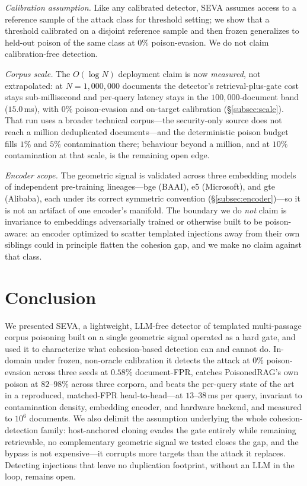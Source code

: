 \documentclass[conference]{IEEEtran}
\begin{document}
\emph{Calibration assumption.} Like any calibrated detector, SEVA assumes access
to a reference sample of the attack class for threshold setting; we show that a
threshold calibrated on a disjoint reference sample and then frozen generalizes to
held-out poison of the same class at $0\%$ poison-evasion.
We do not claim calibration-free detection.

\emph{Corpus scale.} The $O(\log N)$ deployment claim is now \emph{measured}, not
extrapolated: at $N=1{,}000{,}000$ documents the detector's retrieval-plus-gate cost
stays sub-millisecond and per-query latency stays in the $100{,}000$-document band
($15.0$\,ms), with $0\%$ poison-evasion and on-target calibration
(\S\ref{subsec:scale}). That run uses a broader technical corpus---the security-only
source does not reach a million deduplicated documents---and the deterministic poison
budget fills $1\%$ and $5\%$ contamination there; behaviour beyond a million, and at
$10\%$ contamination at that scale, is the remaining open edge.

\emph{Encoder scope.} The geometric signal is validated across three embedding models
of independent pre-training lineages---bge (BAAI), e5 (Microsoft), and gte (Alibaba),
each under its correct symmetric convention (\S\ref{subsec:encoder})---so it is not an
artifact of one encoder's manifold. The boundary we do \emph{not} claim is invariance
to embeddings adversarially trained or otherwise built to be poison-aware: an encoder
optimized to scatter templated injections away from their own siblings could in
principle flatten the cohesion gap, and we make no claim against that class.

\section{Conclusion}
We presented SEVA, a lightweight, LLM-free detector of templated multi-passage corpus
poisoning built on a single geometric signal operated as a hard gate, and used it to
characterize what cohesion-based detection can and cannot do. In-domain under frozen,
non-oracle calibration it detects the attack at $0\%$ poison-evasion across three seeds at
$0.58\%$ document-FPR, catches PoisonedRAG's own poison at $82$--$98\%$ across three corpora,
and beats the per-query state of the art in a reproduced, matched-FPR head-to-head---at
$13$--$38$\,ms per query, invariant to contamination density, embedding encoder, and hardware
backend, and measured to $10^6$ documents. We also delimit the assumption underlying the whole
cohesion-detection family: host-anchored cloning evades the gate entirely while remaining
retrievable, no complementary geometric signal we tested closes the gap, and the bypass is not
expensive---it corrupts more targets than the attack it replaces. Detecting injections that leave no
duplication footprint, without an LLM in the loop, remains open.
\end{document}
